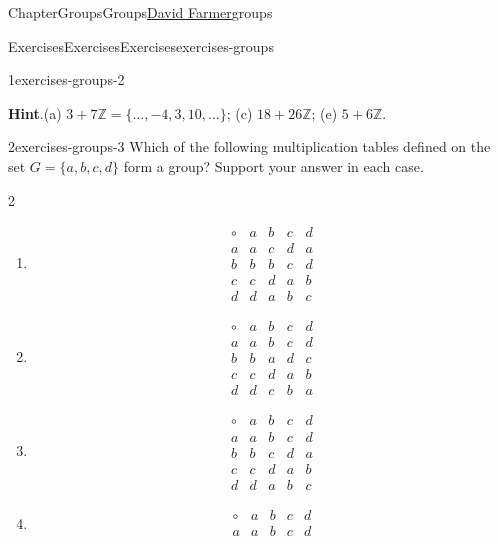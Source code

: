 \documentclass[oneside,10pt,]{book}
\newcommand{\blocktitlefont}{\relax}
\numberwithin{equation}{section}
\begin{document}
\begin{chapterptx}{Chapter}{Groups}{}{Groups}{\hyperlink{dfarmer}{David Farmer}}{}{groups}
\begin{exercises-section}{Exercises}{Exercises}{}{Exercises}{}{}{exercises-groups}
\begin{divisionexercise}{1}{}{}{exercises-groups-2}
\par\smallskip%
\noindent\textbf{\blocktitlefont Hint}.\hypertarget{exercises-groups-2-2}{}\quad{}(a) \(3 + 7 \mathbb Z = \{ \ldots, -4, 3, 10, \ldots \}\);  (c) \(18 + 26 \mathbb Z\);  (e) \(5 + 6 \mathbb Z\).%
\end{divisionexercise}%
\begin{divisionexercise}{2}{}{}{exercises-groups-3}%
Which of the following multiplication tables defined on the set \(G = \{ a, b, c, d \}\) form a group? Support your answer in each case.%
%
\begin{multicols}{2}
\begin{enumerate}[label={(\alph*)}]
\item{}%
\begin{equation*}
\begin{array}{c|cccc}
\circ & a & b & c & d \\
\hline
a & a & c & d & a \\
b & b & b & c & d \\
c & c & d & a & b \\
d & d & a & b & c
\end{array}
\end{equation*}
%
\item{}%
\begin{equation*}
\begin{array}{c|cccc}
\circ & a & b & c & d \\
\hline
a & a & b & c & d \\
b & b & a & d & c \\
c & c & d & a & b \\
d & d & c & b & a
\end{array}
\end{equation*}
%
\item{}%
\begin{equation*}
\begin{array}{c|cccc}
\circ & a & b & c & d \\
\hline
a & a & b & c & d \\
b & b & c & d & a \\
c & c & d & a & b \\
d & d & a & b & c
\end{array}
\end{equation*}
%
\item{}%
\begin{equation*}
\begin{array}{c|cccc}
\circ & a & b & c & d \\
\hline
a & a & b & c & d \\

\end{array}
\end{equation*}
\end{enumerate}
\end{multicols}
\end{divisionexercise}
\end{exercises-section}
\end{chapterptx}
\end{document}
